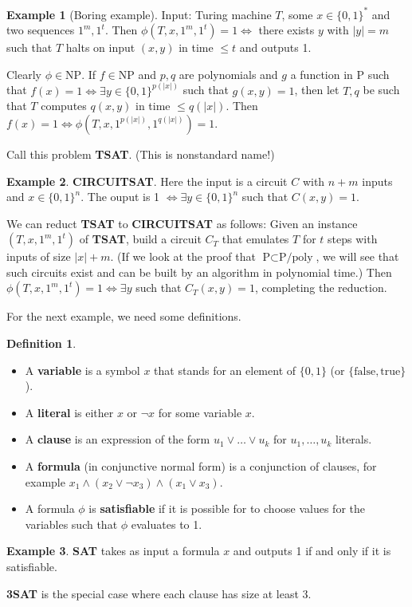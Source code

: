 \documentclass{article}
\theoremstyle{definition}
\newtheorem{example}{Example}[section]
\newtheorem{defn}{Definition}[section]
\begin{document}
\begin{example}[Boring example]
    Input: Turing machine $T$, some $x \in \{0,1\}^*$ and two sequences $1^m, 1^t$. Then $\phi(T,x,1^m,1^t) = 1 \iff$ there exists $y$ with $\left|y\right|=m$ such that $T$ halts on input $(x,y)$ in time $\le t$ and outputs 1.
    \vspace{1mm}
     
    Clearly $\phi \in \text{NP}$. If $f \in \text{NP}$ and $p,q$ are polynomials and $g$ a function in $\text{P}$ such that $f(x)=1 \iff \exists y \in \{0,1\}^{p(\left|x\right|)}$ such that $g(x,y)=1$, then let $T,q$ be such that $T$ computes $q(x,y)$ in time $\le q(\left|x\right|)$. Then $f(x)=1 \iff \phi(T,x,1^{p(\left|x\right|)},1^{q(\left|x\right|)})=1$.
\end{example}
Call this problem \textbf{TSAT}. (This is nonstandard name!)
\begin{example}
    \textbf{CIRCUITSAT}. Here the input is a circuit $C$ with $n+m$ inputs and $x \in \{0,1\}^n$. The ouput is 1 $\iff \exists y \in \{0,1\}^n$ such that $C(x,y)=1$.
\end{example}
We can reduct \textbf{TSAT} to \textbf{CIRCUITSAT} as follows: Given an instance $(T,x,1^m,1^t)$ of \textbf{TSAT}, build a circuit $C_{T}$ that emulates $T$ for $t$ steps with inputs of size $\left|x\right|+m$. (If we look at the proof that $\text{P} \subset \text{P/poly}$, we will see that such circuits exist and can be built by an algorithm in polynomial time.) Then $\phi(T,x,1^m,1^t) =1 \iff \exists y$ such that $C_T(x,y)=1$, completing the reduction.
\vspace{1mm}
 
For the next example, we need some definitions.
\begin{defn}
    \begin{itemize}
        \item A \textbf{variable} is a symbol $x$ that stands for an element of $\{0,1\}$ (or $\{\text{false},\text{true}\}$).
        \item A \textbf{literal} is either $x$ or $\neg x$ for some variable $x$.
        \item A \textbf{clause} is an expression of the form $u_1 \vee \ldots \vee u_k$ for $u_1,\ldots,u_k$ literals.
        \item A \textbf{formula} (in conjunctive normal form) is a conjunction of clauses, for example $x_1 \wedge (x_2 \vee \neg x_3) \wedge (x_1 \vee x_3)$.
        \item A formula $\phi$ is \textbf{satisfiable} if it is possible for to choose values for the variables such that $\phi$ evaluates to 1.
    \end{itemize}
\end{defn}
\begin{example}
    \textbf{SAT} takes as input a formula $x$ and outputs 1 if and only if it is satisfiable.
    \vspace{1mm}
     
    \textbf{3SAT} is the special case where each clause has size at least 3.
\end{example}
\end{document}
